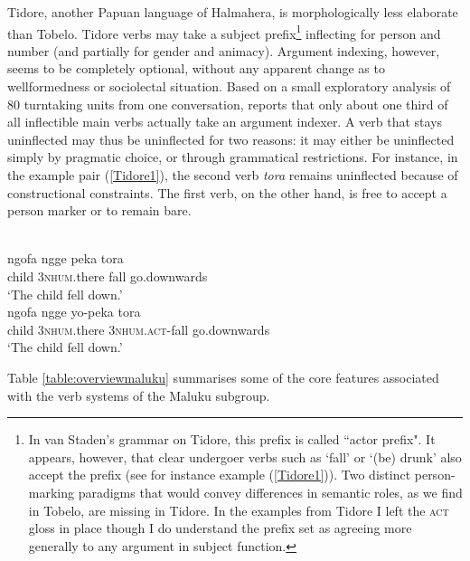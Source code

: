 Tidore, another Papuan language of Halmahera, is morphologically less elaborate than Tobelo. Tidore verbs may take a subject prefix\footnote{In van Staden's grammar on Tidore, this prefix is called ``actor prefix". It appears, however, that clear undergoer verbs such as `fall' or `(be) drunk' also accept the prefix (see for instance example (\ref{Tidore1})). Two distinct person-marking paradigms that would convey differences in semantic roles, as we find in Tobelo, are missing in Tidore. In the examples from Tidore I left the \textsc{act} gloss in place though I do understand the prefix set as agreeing more generally to any argument in subject function.} inflecting for person and number (and partially for gender and animacy). Argument indexing, however, seems to be completely optional, without any apparent change as to wellformedness or sociolectal situation. Based on a small exploratory analysis of 80 turntaking units from one conversation, \citet[79]{vanstaden2000tidore} reports that only about one third of all inflectible main verbs actually take an argument indexer. A verb that stays uninflected may thus be uninflected for two reasons: it may either be uninflected simply by pragmatic choice, or through grammatical restrictions. For instance, in the example pair (\ref{Tidore1}), the second verb \textit{tora} remains uninflected because of constructional constraints. The first verb, on the other hand, is free to accept a person marker or to remain bare.

\ea \label{Tidore1}
\\
\ea
\gll ngofa ngge peka tora \\
child 3\textsc{nhum}.there fall go.downwards \\
\glft `The child fell down.’ \\ 
\ex
\gll ngofa ngge yo-peka tora \\ 
child 3\textsc{nhum}.there 3\textsc{nhum}.\textsc{act}-fall go.downwards \\
\glft `The child fell down.’ \\    
\z
\z

Table \ref{table:overviewmaluku} summarises some of the core features associated with the verb systems of the Maluku subgroup.

\begin{table}[h]
\caption[Basic features of Maluku verb systems]{Overview of basic verbal features of the Maluku languages in the EI data set. Constituent order lists only the basic pattern, pragmatically induced alternative patterns are often also available. Brackets indicate optional use of argument indexers.}
\label{table:overviewmaluku}
\end{table}

